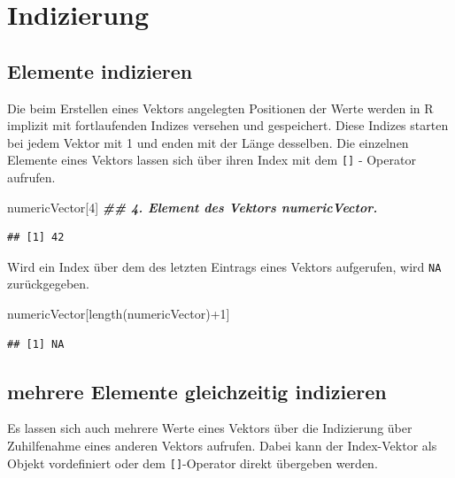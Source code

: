 \documentclass[
]{book}
\newenvironment{Shaded}{\begin{snugshade}}{\end{snugshade}}
\newcommand{\DecValTok}[1]{\textcolor[rgb]{0.00,0.00,0.81}{#1}}
\newcommand{\DocumentationTok}[1]{\textcolor[rgb]{0.56,0.35,0.01}{\textbf{\textit{#1}}}}
\newcommand{\FunctionTok}[1]{\textcolor[rgb]{0.00,0.00,0.00}{#1}}
\newcommand{\NormalTok}[1]{#1}
\newcommand{\SpecialCharTok}[1]{\textcolor[rgb]{0.00,0.00,0.00}{#1}}
\begin{document}
\hypertarget{indizierung}{%
\section{Indizierung}\label{indizierung}}

\hypertarget{elemente-indizieren}{%
\subsection{Elemente indizieren}\label{elemente-indizieren}}

Die beim Erstellen eines Vektors angelegten Positionen der Werte werden in R implizit mit fortlaufenden Indizes versehen und gespeichert. Diese Indizes starten bei jedem Vektor mit 1 und enden mit der Länge desselben.
Die einzelnen Elemente eines Vektors lassen sich über ihren Index mit dem \texttt{{[}{]}} - Operator aufrufen.

\begin{Shaded}
\begin{Highlighting}[]
\NormalTok{numericVector[}\DecValTok{4}\NormalTok{] }\DocumentationTok{\#\# 4. Element des Vektors numericVector.}
\end{Highlighting}
\end{Shaded}

\begin{verbatim}
## [1] 42
\end{verbatim}

Wird ein Index über dem des letzten Eintrags eines Vektors aufgerufen, wird \texttt{NA} zurückgegeben.

\begin{Shaded}
\begin{Highlighting}[]
\NormalTok{numericVector[}\FunctionTok{length}\NormalTok{(numericVector)}\SpecialCharTok{+}\DecValTok{1}\NormalTok{]}
\end{Highlighting}
\end{Shaded}

\begin{verbatim}
## [1] NA
\end{verbatim}

\hypertarget{mehrere-elemente-gleichzeitig-indizieren}{%
\subsection{mehrere Elemente gleichzeitig indizieren}\label{mehrere-elemente-gleichzeitig-indizieren}}

Es lassen sich auch mehrere Werte eines Vektors über die Indizierung über Zuhilfenahme eines anderen Vektors aufrufen. Dabei kann der Index-Vektor als Objekt vordefiniert oder dem \texttt{{[}{]}}-Operator direkt übergeben werden.
\end{document}
